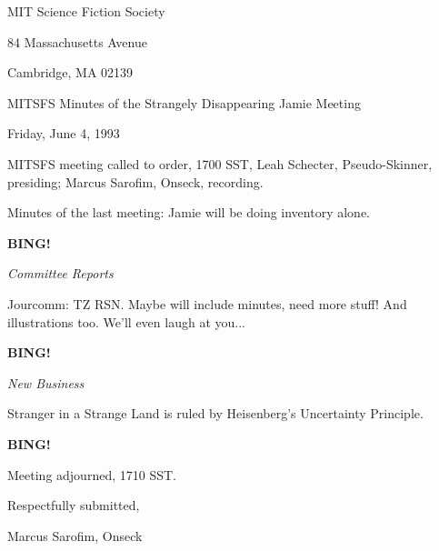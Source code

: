 \documentclass[12pt]{article}
\newcommand{\bing}{{\bf BING!} }
\newcommand{\goto}[1]{\bing \vskip 12pt \centerline{{\em{#1}}}}
\begin{document}
\begin{center}

MIT Science Fiction Society 

84 Massachusetts Avenue

Cambridge, MA 02139

\vspace{12pt}

MITSFS Minutes of the Strangely Disappearing Jamie Meeting

Friday, June 4, 1993

\end{center}
 
\vspace{18pt}

\setlength{\parskip}{6pt}

\noindent
MITSFS meeting called to order, 1700 SST,
Leah Schecter, Pseudo-Skinner, presiding; Marcus Sarofim, Onseck, recording.

Minutes of the last meeting: Jamie will be doing inventory alone.

\goto{Committee Reports}

Jourcomm: TZ RSN. Maybe will include minutes, need more stuff! And illustrations too. We'll even laugh at you...

\goto{New Business}

Stranger in a Strange Land is ruled by Heisenberg's Uncertainty Principle.

\bing

\vspace{12pt}

\noindent
Meeting adjourned, 1710 SST.

\vspace{18pt}

\centerline{Respectfully submitted,}
\centerline{Marcus Sarofim, Onseck}
\end{document}
